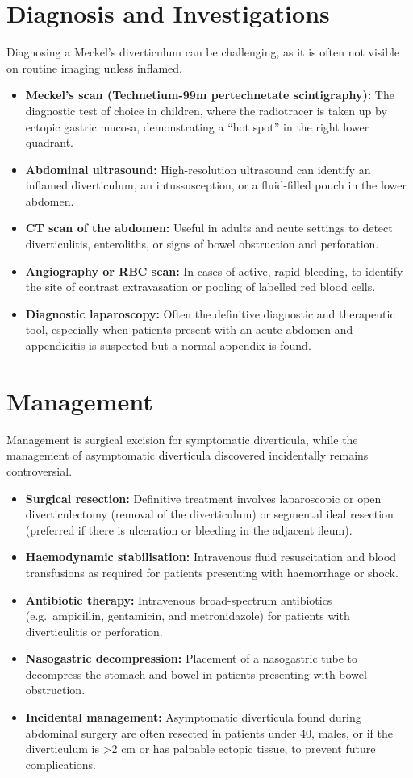\section*{Diagnosis and Investigations}
Diagnosing a Meckel's diverticulum can be challenging, as it is often not visible on routine imaging unless inflamed.
\begin{itemize}
    \item \textbf{Meckel's scan (Technetium-99m pertechnetate scintigraphy):} The diagnostic test of choice in children, where the radiotracer is taken up by ectopic gastric mucosa, demonstrating a ``hot spot'' in the right lower quadrant.
    \item \textbf{Abdominal ultrasound:} High-resolution ultrasound can identify an inflamed diverticulum, an intussusception, or a fluid-filled pouch in the lower abdomen.
    \item \textbf{CT scan of the abdomen:} Useful in adults and acute settings to detect diverticulitis, enteroliths, or signs of bowel obstruction and perforation.
    \item \textbf{Angiography or RBC scan:} In cases of active, rapid bleeding, to identify the site of contrast extravasation or pooling of labelled red blood cells.
    \item \textbf{Diagnostic laparoscopy:} Often the definitive diagnostic and therapeutic tool, especially when patients present with an acute abdomen and appendicitis is suspected but a normal appendix is found.
\end{itemize}

\section*{Management}
Management is surgical excision for symptomatic diverticula, while the management of asymptomatic diverticula discovered incidentally remains controversial.
\begin{itemize}
    \item \textbf{Surgical resection:} Definitive treatment involves laparoscopic or open diverticulectomy (removal of the diverticulum) or segmental ileal resection (preferred if there is ulceration or bleeding in the adjacent ileum).
    \item \textbf{Haemodynamic stabilisation:} Intravenous fluid resuscitation and blood transfusions as required for patients presenting with haemorrhage or shock.
    \item \textbf{Antibiotic therapy:} Intravenous broad-spectrum antibiotics (e.g.\ ampicillin, gentamicin, and metronidazole) for patients with diverticulitis or perforation.
    \item \textbf{Nasogastric decompression:} Placement of a nasogastric tube to decompress the stomach and bowel in patients presenting with bowel obstruction.
    \item \textbf{Incidental management:} Asymptomatic diverticula found during abdominal surgery are often resected in patients under 40, males, or if the diverticulum is >2 cm or has palpable ectopic tissue, to prevent future complications.
\end{itemize}

